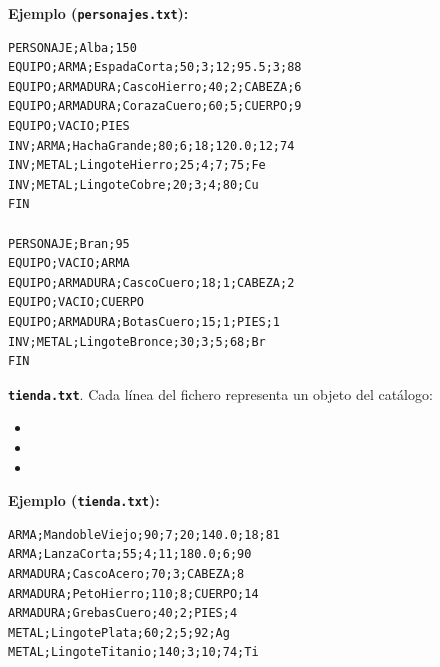\documentclass[11pt,a4paper]{article}
\begin{document}
\textbf{Ejemplo (\texttt{personajes.txt}):}
\begin{Verbatim}[frame=single, fontsize=\small]
PERSONAJE;Alba;150
EQUIPO;ARMA;EspadaCorta;50;3;12;95.5;3;88
EQUIPO;ARMADURA;CascoHierro;40;2;CABEZA;6
EQUIPO;ARMADURA;CorazaCuero;60;5;CUERPO;9
EQUIPO;VACIO;PIES
INV;ARMA;HachaGrande;80;6;18;120.0;12;74
INV;METAL;LingoteHierro;25;4;7;75;Fe
INV;METAL;LingoteCobre;20;3;4;80;Cu
FIN

PERSONAJE;Bran;95
EQUIPO;VACIO;ARMA
EQUIPO;ARMADURA;CascoCuero;18;1;CABEZA;2
EQUIPO;VACIO;CUERPO
EQUIPO;ARMADURA;BotasCuero;15;1;PIES;1
INV;METAL;LingoteBronce;30;3;5;68;Br
FIN
\end{Verbatim}

\textbf{\texttt{tienda.txt}}. Cada línea del fichero representa un objeto del catálogo:
\begin{itemize}[noitemsep, topsep=0pt]
    \item {}
    \item {}
    \item {}
\end{itemize}

\textbf{Ejemplo (\texttt{tienda.txt}):}
\begin{Verbatim}[frame=single, fontsize=\small]
ARMA;MandobleViejo;90;7;20;140.0;18;81
ARMA;LanzaCorta;55;4;11;180.0;6;90
ARMADURA;CascoAcero;70;3;CABEZA;8
ARMADURA;PetoHierro;110;8;CUERPO;14
ARMADURA;GrebasCuero;40;2;PIES;4
METAL;LingotePlata;60;2;5;92;Ag
METAL;LingoteTitanio;140;3;10;74;Ti
\end{Verbatim}
\end{document}
